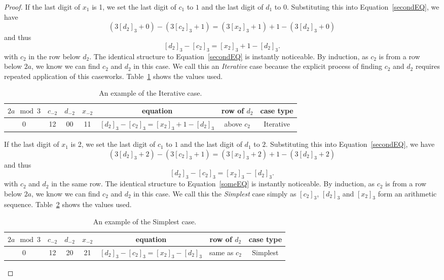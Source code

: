 \documentclass[12pt,reqno]{article}
\theoremstyle{plain}
\theoremstyle{definition}
\theoremstyle{remark}
\begin{document}
\begin{proof}
If the last digit of $x_1$ is 1, we set the last digit of $c_1$ to $1$ and the last digit of $d_1$ to $0$. Substituting this into Equation~\eqref{secondEQ}, we have
\[(3[d_2]_3+0)-(3[c_2]_3+1) = (3[x_2]_3+1)+1-(3[d_2]_3+0)\]
and thus
\[[d_2]_3-[c_2]_3 = [x_2]_3 +1 - [d_2]_3. \]
with $c_2$ in the row below $d_2$. The identical structure to Equation~\eqref{secondEQ} is instantly noticeable. By induction, as $c_2$ is from a row below $2a$, we know we can find $c_2$ and $d_2$ in this case. We call this an \textit{Iterative} case because the explicit process of finding $c_2$ and $d_2$ requires repeated application of this caseworks. Table~\ref{table:iterative} shows the values used.
\begin{table}[ht!]
\begin{center}
\begin{tabular}{|c|c|c|c|c|c|c|}
\hline
 $2a \mod{3}$  & $c_{-2}$ & $d_{-2}$& $x_{-2}$ & equation & row of $d_2$ & case type \\
 \hline
 0 &  12 &00  & 11 & $[d_2]_3-[c_2]_3 = [x_2]_3+1 - [d_2]_3$&  above $c_2$ & Iterative\\
  \hline
\end{tabular}
\caption{An example of the Iterative case.}
\label{table:iterative}
\end{center}
\end{table}


If the last digit of $x_1$ is 2, we set the last digit of $c_1$ to $1$ and the last digit of $d_1$ to $2$. Substituting this into Equation~\eqref{secondEQ}, we have
\[(3[d_2]_3+2)-(3[c_2]_3+1) = (3[x_2]_3+2)+1-(3[d_2]_3+2)\]
and thus
\[[d_2]_3-[c_2]_3 = [x_2]_3 - [d_2]_3.\]
with $c_2$ and $d_2$ in the same row. The identical structure to Equation~\eqref{someEQ} is instantly noticeable. By induction, as $c_2$ is from a row below $2a$, we know we can find $c_2$ and $d_2$ in this case. We call this the \textit{Simplest} case simply as $[c_2]_3$, $[d_2]_3$ and $[x_2]_3$ form an arithmetic sequence.  Table~\ref{table:simplest} shows the values used.

\begin{table}[ht!]
\begin{center}
\begin{tabular}{|c|c|c|c|c|c|c|}
\hline
 $2a \mod{3}$  & $c_{-2}$ & $d_{-2}$& $x_{-2}$ & equation & row of $d_2$ & case type \\
 \hline
 0 &  12 &20  & 21 & $[d_2]_3-[c_2]_3 = [x_2]_3 - [d_2]_3$&  same as $c_2$ & Simplest\\
  \hline
\end{tabular}
\caption{An example of the Simplest case.}
\label{table:simplest}
\end{center}
\end{table}



\end{proof}
\end{document}
